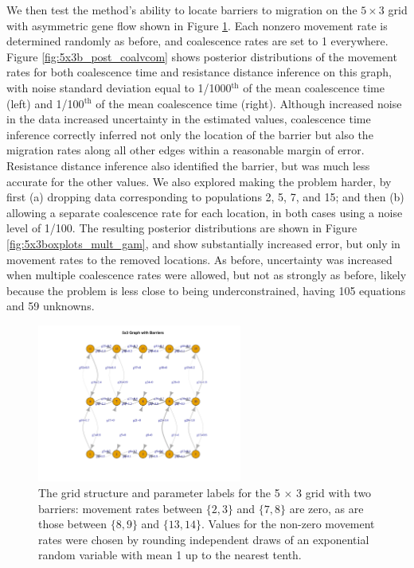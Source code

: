 \documentclass{article}
\begin{document}
We then test the method's ability to locate barriers to migration
on the $5 \times 3$ grid with asymmetric gene flow shown in Figure \ref{fig:5x3b_grid}. 
Each nonzero movement rate is determined randomly as before,
and coalescence rates are set to 1 everywhere.
Figure \ref{fig:5x3b_post_coalvcom} shows posterior distributions of the movement rates
for both coalescence time and resistance distance inference
on this graph, with noise standard deviation equal to
1/1000${}^\text{th}$ of the mean coalescence time (left)
and 1/100${}^\text{th}$ of the mean coalescence time (right).
Although increased noise in the data increased uncertainty in the estimated values,
coalescence time inference correctly inferred not only the location of the barrier
but also the migration rates along all other edges within a reasonable margin of error.
Resistance distance inference also identified the barrier,
but was much less accurate for the other values.
We also explored making the problem harder,
by first (a) dropping data corresponding to populations 2, 5, 7, and 15;
and then (b) allowing a separate coalescence rate for each location,
in both cases using a noise level of 1/100.
The resulting posterior distributions are shown in Figure \ref{fig:5x3boxplots_mult_gam},
and show substantially increased error,
but only in movement rates to the removed locations.
As before, uncertainty was increased when multiple coalescence rates were allowed,
but not as strongly as before, likely because the problem is less close to being underconstrained,
having 105 equations and 59 unknowns.


\begin{figure}
\centering
     \includegraphics[width=0.6\textwidth]{figs/5x3b_grid}
    \caption{The grid structure and parameter labels
    for the 5 $\times$ 3 grid with two barriers:
    movement rates between $\{2,3\}$ and $\{7,8\}$ are zero,
    as are those between $\{8,9\}$ and $\{13,14\}$.
    Values for the non-zero movement rates 
    were chosen by rounding independent draws of an exponential random variable with mean 1 
    up to the nearest tenth.
    } \label{fig:5x3b_grid}
\end{figure}
\end{document}
